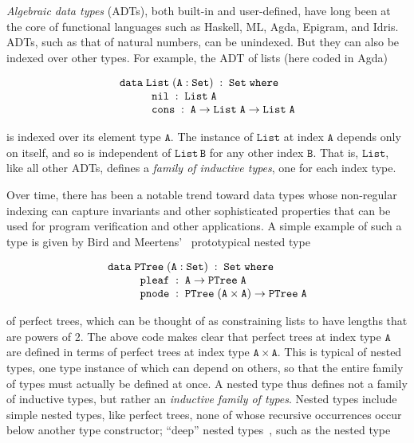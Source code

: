 \documentclass[runningheads]{llncs}
\begin{document}
\vspace*{-0.1in}

{\em Algebraic data types} (ADTs), both built-in and user-defined,
have long been at the core of functional languages such as Haskell,
ML, Agda, Epigram, and Idris. ADTs, such as that of natural numbers,
can be unindexed. But they can also be indexed over other types. For
example, the ADT of lists (here coded in Agda)

\vspace*{-0.05in}

{\small
\[\begin{array}{l}
\mathtt{data\; List \;(A : Set)\;:\;Set\;where}\\
\hspace*{0.4in}\mathtt{nil\;:\; List\;A}\\
\hspace*{0.4in}\mathtt{cons\;:\;A \rightarrow List\;A \rightarrow List\;A}
\end{array}\]}

\vspace*{-0.05in}

\noindent
is indexed over its element type $\mathtt{A}$.  The instance of
$\mathtt{List}$ at index $\mathtt{A}$ depends only on itself, and so is
independent of $\mathtt{List\,B}$ for any other index $\mathtt{B}$.
That is, $\mathtt{List}$, like all other ADTs, defines a {\em family
  of inductive types}, one for each index type.

Over time, there has been a notable trend toward data types whose
non-regular indexing can capture invariants and other sophisticated
properties that can be used for program verification and other
applications.  A simple example of such a type is given by Bird and
Meertens'~\cite{bm98} prototypical nested type

\vspace*{-0.05in}

\[\begin{array}{l}
\mathtt{data\; PTree\;(A : Set)\;:\;Set\;where}\\
\hspace*{0.4in}\mathtt{pleaf\;:\;A \rightarrow PTree\;A}\\
\hspace*{0.4in}\mathtt{pnode\;:\;PTree\;(A \times A) \rightarrow PTree\;A}
\end{array}\]

\vspace*{-0.05in}

\noindent
of perfect trees, which can be thought of as constraining lists to
have lengths that are powers of 2.  The above code makes clear that
perfect trees at index type $\mathtt{A}$ are defined in terms of
perfect trees at index type $\mathtt{A \times A}$. This is typical of
nested types, one type instance of which can depend on others, so that
the entire family of types must actually be defined at once. A nested
type thus defines not a family of inductive types, but rather an {\em
  inductive family of types}.  Nested types include simple nested
types, like perfect trees, none of whose recursive occurrences occur
below another type constructor; ``deep'' nested types~\cite{jp20},
such as the nested type
\end{document}
